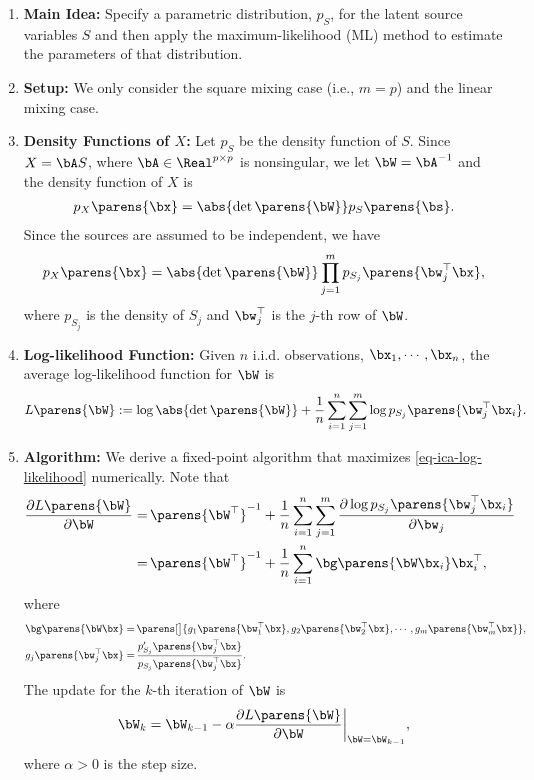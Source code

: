 \documentclass[12pt]{article}
\begin{document}
\begin{enumerate}[label=\textbf{\arabic*.}]

	\item \textbf{Main Idea:} Specify a parametric distribution, $p_S$, for the latent source variables $S$ and then apply the maximum-likelihood (ML) method to estimate the parameters of that distribution. 

	\item \textbf{Setup:} We only consider the square mixing case (i.e., $m = p$) and the linear mixing case. 
	
	\item \textbf{Density Functions of $X$:} Let $p_S$ be the density function of $S$. Since $X = \bA S$, where $\bA \in \Real^{p \times p}$ is nonsingular, we let $\bW = \bA^{-1}$ and the density function of $X$ is 
	\begin{align*}
		p_X \parens{\bx} = \abs{\det \parens{\bW}} p_S \parens{\bs}. 
	\end{align*}
	Since the sources are assumed to be independent, we have 
	\begin{align}
		p_X \parens{\bx} = \abs{\det \parens{\bW}} \prod_{j=1}^m p_{S_j} \parens{\bw_j^\top \bx}, 
	\end{align}
	where $p_{S_j}$ is the density of $S_j$ and $\bw_j^\top$ is the $j$-th row of $\bW$. 
	
	\item \textbf{Log-likelihood Function:} Given $n$ i.i.d. observations, $\bx_1, \cdots, \bx_n$, the average log-likelihood function for $\bW$ is 
	\begin{align}\label{eq-ica-log-likelihood}
		L \parens{\bW} := \log \abs{\det \parens{\bW}} + \frac{1}{n} \sum_{i=1}^n \sum_{j=1}^m \log p_{S_j} \parens{\bw_j^\top \bx_i}. 
	\end{align}
	
	\item \textbf{Algorithm:} We derive a fixed-point algorithm that maximizes \eqref{eq-ica-log-likelihood} numerically. Note that 
	\begin{align}
		\frac{\partial L \parens{\bW}}{\partial \bW} = & \, \parens{\bW^\top}^{-1} + \frac{1}{n} \sum_{i=1}^n \sum_{j=1}^m \frac{\partial \log p_{S_j} \parens{\bw_j^\top \bx_i}}{\partial \bw_j} \nonumber \\ 
		= & \, \parens{\bW^\top}^{-1} + \frac{1}{n} \sum_{i=1}^n \bg \parens{\bW \bx_i} \bx_i^\top, 
	\end{align}
	where 
	\begin{align*}
		\bg \parens{\bW \bx} = & \, \parens[\big]{g_1 \parens{\bw_1^\top \bx}, g_2 \parens{\bw_2^\top \bx}, \cdots, g_m \parens{\bw_m^\top \bx}}, \\ 
		g_j \parens{\bw_j^\top \bx} = & \, \frac{p_{S_j}' \parens{\bw_j^\top \bx}}{p_{S_j} \parens{\bw_j^\top \bx}}. 
	\end{align*}
	The update for the $k$-th iteration of $\bW$ is 
	\begin{align}\label{eq-mlica-update}
		\bW_k = \bW_{k-1} - \alpha \frac{\partial L \parens{\bW}}{\partial \bW}\bigg\vert_{\bW = \bW_{k-1}}, 
	\end{align}
	where $\alpha > 0$ is the step size. 
	

\end{enumerate}
\end{document}
